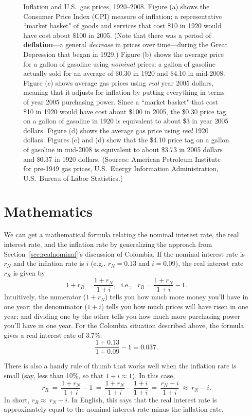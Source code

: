 \begin{figure}
{        \label{graphgasreal1920}
        }
\caption{Inflation and U.S.\ gas prices, 1920--2008. Figure (a) shows the Consumer Price Index (CPI) measure of inflation; a representative ``market basket" of goods and services that cost \$10 in 1920 would have cost about \$100 in 2005. (Note that there was a period of \textbf{deflation}---a general \emph{decrease} in prices over time---during the Great Depression that began in 1929.) Figure (b) shows the average price for a gallon of gasoline using \emph{nominal} prices: a gallon of gasoline actually sold for an average of \$0.30 in 1920 and \$4.10 in mid-2008. Figure (c) shows average gas prices using \emph{real} year 2005 dollars, meaning that it adjusts for inflation by putting everything in terms of year 2005 purchasing power. Since a ``market basket" that cost \$10 in 1920 would have cost about \$100 in 2005, the \$0.30 price tag on a gallon of gasoline in 1920 is equivalent to about \$3 in year 2005 dollars. Figure (d) shows the average gas price using \emph{real} 1920 dollars. Figures (c) and (d) show that the \$4.10 price tag on a gallon of gasoline in mid-2008 is equivalent to about \$3.73 in 2005 dollars and \$0.37 in 1920 dollars. (Sources: American Petroleum Institute for pre-1949 gas prices, U.S.\ Energy Information Administration, U.S.\ Bureau of Labor Statistics.)}
\label{realnominalgas}
\end{figure}


\section{Mathematics}

We can get a mathematical formula relating the nominal interest rate, the real interest rate, and the inflation rate by generalizing the approach from Section~\ref{sec:realnominal}'s discussion of Colombia. If the nominal interest rate is $r_N$ and the inflation rate is $i$ (e.g., $r_N=0.13$ and $i=0.09$), the real interest rate $r_R$ is given by
\[
1+r_R=\frac{1+r_N}{1+i}, \ \ \ \mbox{i.e.}, \ \ \ r_R=\frac{1+r_N}{1+i}
-1.
\]
Intuitively, the numerator ($1+r_N$) tells you how much more money you'll have in one year; the denominator ($1+i$) tells you how much prices will have risen in one year; and dividing one by the other tells you how much more purchasing power you'll have in one year. For the Colombia situation described above, the formula gives a real interest rate of 3.7\%:
\[
\frac{1+0.13}{1+0.09} -1 = 0.037.
\]

There is also a handy rule of thumb that works well when the inflation rate is small (say, less than 10\%, so that $1+i\approx 1$). In this case,
\[
\displaystyle r_R \ = \ \frac{1+r_N}{1+i} -1 \ = \ \frac{1+r_N}{1+i} - \frac{1+i}{1+i} \ = \ \frac{r_N-i}{1+i} \  \approx \ r_N-i.
\]
%
In short, $r_R \approx \ r_N-i$. In English, this says that the real interest rate is approximately equal to the nominal interest rate minus the inflation rate.

